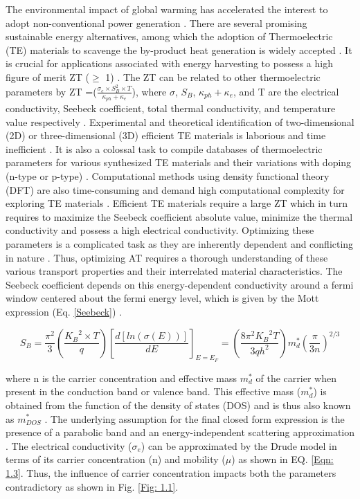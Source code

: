 \justify
\skipspace
The environmental impact of global warming has accelerated the interest to adopt non-conventional power generation \cite{EPFL}. There are several promising sustainable energy alternatives, among which the adoption of Thermoelectric (TE) materials to scavenge the by-product heat generation is widely accepted \cite{EPFL}. It is crucial for applications associated with energy harvesting to possess a high figure of merit ZT ($\geq$ 1) \cite{EPFL}.
\justify
\skipspace
The ZT can be related to other thermoelectric parameters by ZT =($\frac{\sigma_e \times S_B^2 \times T}{\kappa_{ph} + \kappa_e}$), where $\sigma$, $S_B$, $\kappa_{ph} + \kappa_{e}$, and T are the electrical conductivity, Seebeck coefficient, total thermal conductivity, and temperature value respectively \cite{EPFL}.
\justify
\skipspace
Experimental and theoretical identification of two-dimensional (2D) \cite{EPFL} or three-dimensional (3D) efficient TE materials is laborious and time inefficient \cite{EPFL}. It is also a colossal task to compile databases of thermoelectric parameters for various synthesized TE materials and their variations with doping (n-type or p-type) \cite{EPFL}. Computational methods using density functional theory (DFT) are also time-consuming and demand high computational complexity for exploring TE materials \cite{EPFL}.
\newpage
\justify
\skipspace
Efficient TE materials require a large ZT which in turn requires to maximize the Seebeck coefficient absolute value, minimize the thermal conductivity and possess a high electrical conductivity. Optimizing these parameters is a complicated task as they are inherently dependent and conflicting in nature \cite{EPFL}. Thus, optimizing AT requires a thorough understanding of these various transport properties and their interrelated material characteristics.
\justify
\skipspace
The Seebeck coefficient depends on this energy-dependent conductivity around a fermi window centered about the fermi energy level, which is given by the Mott expression (Eq. \ref{Seebeck}) \cite{EPFL}.

\begin{center}
    \begin{equation}
        S_B = \frac{\pi^2}{3}(\frac{{K_B}^2\times T}{q})[\frac{d[ln(\sigma (E))]}{dE}]_{E=E_F} = (\frac{8\pi^2{K_B}^2T}{3qh^2})m_d^*(\frac{\pi}{3n})^{2/3}
        \label{Seebeck}
    \end{equation}
\end{center}
\justify
\skipspace
where n is the carrier concentration and effective mass $m_d^*$ of the carrier when present in the conduction band or valence band. This effective mass ($m_d^*$) is obtained from the function of the density of states (DOS) and is thus also known as $m_{DOS}^*$ \cite{EPFL}. The underlying assumption for the final closed form expression is the presence of a parabolic band and an energy-independent scattering approximation \cite{EPFL}. The electrical conductivity ($\sigma_e$) can be approximated by the Drude model in terms of its carrier concentration (n) and mobility ($\mu$) as shown in EQ. \ref{Eqn: 1.3}. Thus, the influence of carrier concentration impacts both the parameters contradictory as shown in Fig. \ref{Fig: 1.1}.

